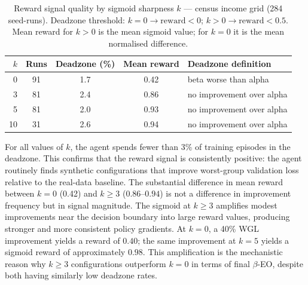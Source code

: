 \documentclass[12pt]{article}
\begin{document}
\begin{table}[h]
\centering
\caption{Reward signal quality by sigmoid sharpness $k$ --- census income
grid (284 seed-runs). Deadzone threshold: $k=0 \to \text{reward} < 0$;
$k > 0 \to \text{reward} < 0.5$.
Mean reward for $k > 0$ is the mean sigmoid value; for $k=0$ it is the
mean normalised difference.}
\label{tab:reward-deadzone}
\small
\renewcommand{\arraystretch}{1.2}
\begin{tabular}{@{}rcccl@{}}
\toprule
$k$ & Runs & Deadzone (\%) & Mean reward & Deadzone definition \\
\midrule
0  & 91 & 1.7 & 0.42 & beta worse than alpha \\
3  & 81 & 2.4 & 0.86 & no improvement over alpha \\
5  & 81 & 2.0 & 0.93 & no improvement over alpha \\
10 & 31 & 2.6 & 0.94 & no improvement over alpha \\
\bottomrule
\end{tabular}
\end{table}

For all values of $k$, the agent spends fewer than 3\% of training
episodes in the deadzone.
This confirms that the reward signal is consistently positive: the agent
routinely finds synthetic configurations that improve worst-group
validation loss relative to the real-data baseline.
The substantial difference in mean reward between $k=0$ (0.42) and $k\geq
3$ ($0.86$--$0.94$) is not a difference in improvement frequency but in
signal magnitude.
The sigmoid at $k \geq 3$ amplifies modest improvements near the decision
boundary into large reward values, producing stronger and more consistent
policy gradients.
At $k=0$, a 40\% WGL improvement yields a reward of $0.40$; the same
improvement at $k=5$ yields a sigmoid reward of approximately $0.98$.
This amplification is the mechanistic reason why $k \geq 3$ configurations
outperform $k=0$ in terms of final $\beta$-EO, despite both having
similarly low deadzone rates.

\end{document}

